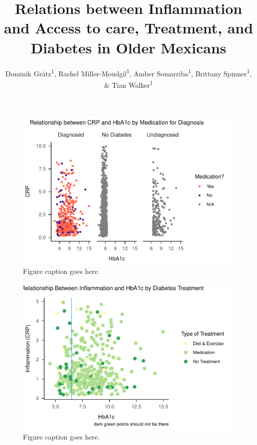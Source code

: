 \documentclass[
  man]{apa6}
\title{Relations between Inflammation and Access to care, Treatment, and Diabetes in Older Mexicans}
\author{Dominik Grätz\textsuperscript{1}, Rachel Miller-Moudgil\textsuperscript{1}, Amber Somarriba\textsuperscript{1}, Brittany Spinner\textsuperscript{1}, \& Tian Walker\textsuperscript{1}}
\date{}
\affiliation{\vspace{0.5cm}\textsuperscript{1} University of Oregon}
\begin{document}
\maketitle

\begin{figure}
\centering
\includegraphics{NEW_Final_Groupof5_files/figure-latex/plot-all-1.pdf}
\caption{\label{fig:plot-all}Figure caption goes here.}
\end{figure}



\begin{figure}
\centering
\includegraphics{NEW_Final_Groupof5_files/figure-latex/plot-all2-1.pdf}
\caption{\label{fig:plot-all2}Figure caption goes here.}
\end{figure}
\end{document}
